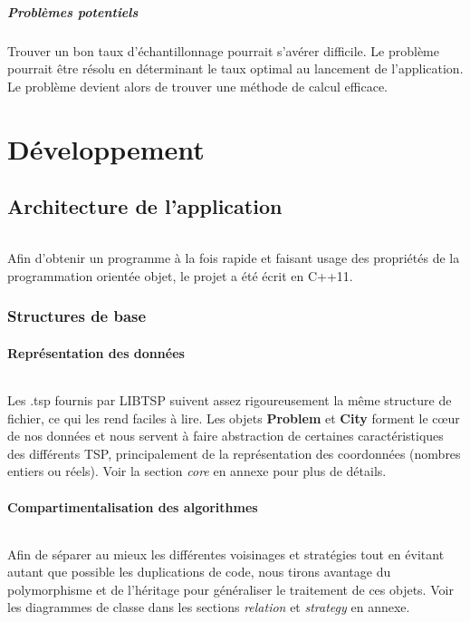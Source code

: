 \documentclass[a4paper,10pt]{report}
\begin{document}
\subsubsection{Problèmes potentiels}
Trouver un bon taux d'échantillonnage pourrait s'avérer difficile. Le problème
pourrait être résolu en déterminant le taux optimal au lancement de
l'application. Le problème devient alors de trouver une méthode de calcul
efficace.


\part{Développement}
\chapter{Architecture de l'application}

\paragraph{}
  Afin d'obtenir un programme à la fois rapide et faisant usage des propriétés
de la programmation orientée objet, le projet a été écrit en C++11.

\section{Structures de base}
\subsection{Représentation des données}
\paragraph{}
  Les .tsp fournis par LIBTSP suivent assez rigoureusement la même structure de
fichier, ce qui les rend faciles à lire. Les objets \textbf{Problem} et
\textbf{City} forment le cœur de nos données et nous servent à faire abstraction
de certaines caractéristiques des différents TSP, principalement de la
représentation des coordonnées (nombres entiers ou réels). Voir la section
\textit{core} en annexe pour plus de détails.

\subsection{Compartimentalisation des algorithmes}
\paragraph{}
  Afin de séparer au mieux les différentes voisinages et stratégies tout en
évitant autant que possible les duplications de code, nous tirons avantage du
polymorphisme et de l'héritage pour généraliser le traitement de ces objets.
Voir les diagrammes de classe dans les sections \textit{relation} et
\textit{strategy} en annexe.
\end{document}
